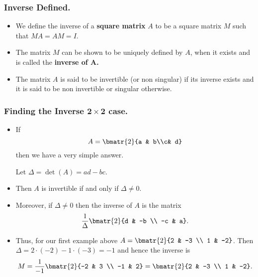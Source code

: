 \begin{frame}%
  \frametitle{Inverse Defined.}
  \begin{itemize}%
 


\item We define the inverse of a {\bf square matrix} $A$ to be a square
matrix $M$ such that $MA=AM=I$.

\item The matrix $M$ can be shown to be uniquely defined by $A$, when it
exists and is called the {\bf inverse of $\mathbf{A}$.} 

\item The matrix $A$ is said to be invertible (or non singular) if its
inverse exists and it is said to be non invertible or singular
otherwise.

\end{itemize}
\end{frame}


\begin{frame}%
  \frametitle{Finding the Inverse $\mathbf{2\times 2}$ case.}
  \begin{itemize}%
 
\item If $$A=\bmatr{2}{a & b\\c& d}$$ then we have a very simple answer.

Let $\Delta=\det(A)=ad-bc$.
\item Then $A$ is invertible if and only if $\Delta\ne 0$.
\item Moreover, if $\Delta\ne 0$ then the inverse of $A$ is the matrix
$$\frac{1}{\Delta}\bmatr{2}{d & -b \\ -c & a}.$$


\item Thus, for our first example above $A=\bmatr{2}{2 & -3 \\ 1 & -2}$.
Then $\Delta=2 \cdot (-2) - 1\cdot (-3) = -1$ and hence the inverse is
$$M=\frac{1}{-1}\bmatr{2}{-2 & 3 \\ -1 & 2} = \bmatr{2}{2 & -3 \\ 1 &
-2}.$$

\end{itemize}
\end{frame}


